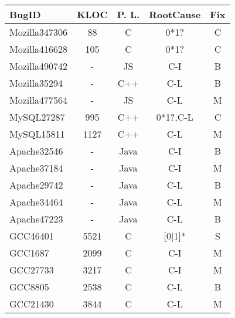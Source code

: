 \begin{table}
  \centering
  \small
  \newcommand{\Yes}[1]{\checkmark{}$_#1$}
  \newcommand{\No}[0]{-}
  \begin{tabular}{lcccc}
    \toprule
   {\bf BugID}           &  {\bf KLOC}     &  {\bf P. L.}           & {\bf RootCause}  & {\bf Fix}\\
   \midrule
   Mozilla347306         & 88              & C                      &  0*1?        & C     \\
   Mozilla416628         & 105             & C                      &  0*1?        & C     \\
   Mozilla490742         &  -             & JS                     &  C-I         & B       \\
   Mozilla35294          &  -             & C++                    &  C-L         & B        \\ 
   Mozilla477564         &  -             & JS                     &  C-L         & M       \\
   \midrule 
   MySQL27287            & 995             & C++                    &  0*1?,C-L        & C     \\
   MySQL15811            & 1127            & C++                    &  C-L         & M \\ 
   \midrule    
   Apache32546           &  -             & Java                   &  C-I         & B  \\
   Apache37184           &  -             & Java                   &  C-I         & M  \\
   Apache29742           &  -             & Java                   &  C-L         & B \\ 
   Apache34464           &  -             & Java                   &  C-L         & M  \\
   Apache47223           &  -             & Java                   &  C-L         & B \\
   \midrule
   GCC46401              & 5521            & C                      &  [0$|$1]*    & S   \\
   GCC1687               & 2099            & C                      &  C-I         & M \\
   GCC27733              & 3217            & C                      &  C-I         & M \\
   GCC8805               & 2538            & C                      &  C-L         & B\\
   GCC21430              & 3844            & C                      &  C-L         & M \\

\end{tabular}
\end{table}
